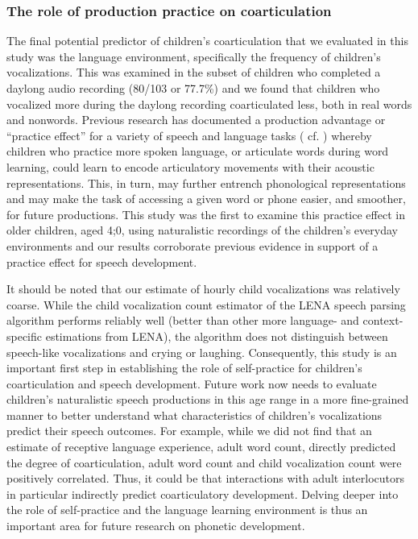 \documentclass[a4paper,man,natbib,donotrepeattitle, apacite]{apa6}
\begin{document}
\subsubsection{The role of production practice on coarticulation}

The final potential predictor of children’s coarticulation that we evaluated in this study was the language environment, specifically the frequency of children’s vocalizations. This was examined in the subset of children who completed a daylong audio recording (80/103 or 77.7\%) and we found that children who vocalized more during the daylong recording coarticulated less, both in real words and nonwords. Previous research has documented a production advantage or ``practice effect'' for a variety of speech and language tasks ( cf. ) whereby children who practice more spoken language, or articulate words during word learning, could learn to encode articulatory movements with their acoustic representations. This, in turn, may further entrench phonological representations and may make the task of accessing a given word or phone easier, and smoother, for future productions. This study was the first to examine this practice effect in older children, aged 4;0, using naturalistic recordings of the children’s everyday environments and our results corroborate previous evidence in support of a practice effect for speech development.

It should be noted that our estimate of hourly child vocalizations was relatively coarse. While the child vocalization count estimator of the LENA speech parsing algorithm performs reliably well \cite{cristiaThoroughEvaluationLanguage2020} (better than other more language- and context-specific estimations from LENA), the algorithm does not distinguish between speech-like vocalizations and crying or laughing. Consequently, this study is an important first step in establishing the role of self-practice for children’s coarticulation and speech development. Future work now needs to evaluate children’s naturalistic speech productions in this age range in a more fine-grained manner to better understand what characteristics of children’s vocalizations predict their speech outcomes. For example, while we did not find that an estimate of receptive language experience, adult word count, directly predicted the degree of coarticulation, adult word count and child vocalization count were positively correlated. Thus, it could be that interactions with adult interlocutors in particular indirectly predict coarticulatory development. Delving deeper into the role of self-practice and the language learning environment is thus an important area for future research on phonetic development. 
\end{document}
